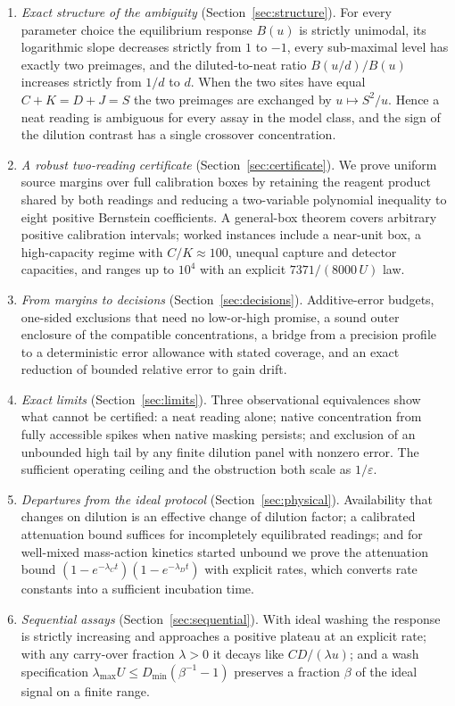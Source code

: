 \documentclass[11pt]{article}
\theoremstyle{plain}
\theoremstyle{definition}
\numberwithin{equation}{section}
\newcommand{\eps}{\varepsilon}
\begin{document}
\begin{enumerate}[leftmargin=2em,itemsep=2pt]
\item \emph{Exact structure of the ambiguity} (Section~\ref{sec:structure}). For
every parameter choice the equilibrium response $B(u)$ is strictly unimodal, its
logarithmic slope decreases strictly from $1$ to $-1$, every sub-maximal level has
exactly two preimages, and the diluted-to-neat ratio $B(u/d)/B(u)$ increases
strictly from $1/d$ to $d$. When the two sites have equal $C+K=D+J=S$ the two
preimages are exchanged by $u\mapsto S^2/u$. Hence a neat reading is ambiguous for
every assay in the model class, and the sign of the dilution contrast has a single
crossover concentration.
\item \emph{A robust two-reading certificate} (Section~\ref{sec:certificate}). We
prove uniform source margins over full calibration boxes by retaining the reagent
product shared by both readings and reducing a two-variable polynomial inequality to
eight positive Bernstein coefficients. A general-box theorem covers arbitrary
positive calibration intervals; worked instances include a near-unit box, a
high-capacity regime with $C/K\approx100$, unequal capture and detector capacities,
and ranges up to $10^4$ with an explicit $7371/(8000\,U)$ law.
\item \emph{From margins to decisions} (Section~\ref{sec:decisions}). Additive-error
budgets, one-sided exclusions that need no low-or-high promise, a sound outer
enclosure of the compatible concentrations, a bridge from a precision profile to a
deterministic error allowance with stated coverage, and an exact reduction of
bounded relative error to gain drift.
\item \emph{Exact limits} (Section~\ref{sec:limits}). Three observational
equivalences show what cannot be certified: a neat reading alone; native
concentration from fully accessible spikes when native masking persists; and
exclusion of an unbounded high tail by any finite dilution panel with nonzero
error. The sufficient operating ceiling and the obstruction both scale as $1/\eps$.
\item \emph{Departures from the ideal protocol} (Section~\ref{sec:physical}).
Availability that changes on dilution is an effective change of dilution factor; a
calibrated attenuation bound suffices for incompletely equilibrated readings; and
for well-mixed mass-action kinetics started unbound we prove the attenuation bound
$(1-e^{-\lambda_Ct})(1-e^{-\lambda_Dt})$ with explicit rates, which converts rate
constants into a sufficient incubation time.
\item \emph{Sequential assays} (Section~\ref{sec:sequential}). With ideal washing
the response is strictly increasing and approaches a positive plateau at an
explicit rate; with any carry-over fraction $\lambda>0$ it decays like
$CD/(\lambda u)$; and a wash specification $\lambda_{\max}U\le D_{\min}(\beta^{-1}-1)$
preserves a fraction $\beta$ of the ideal signal on a finite range.
\end{enumerate}
\end{document}
